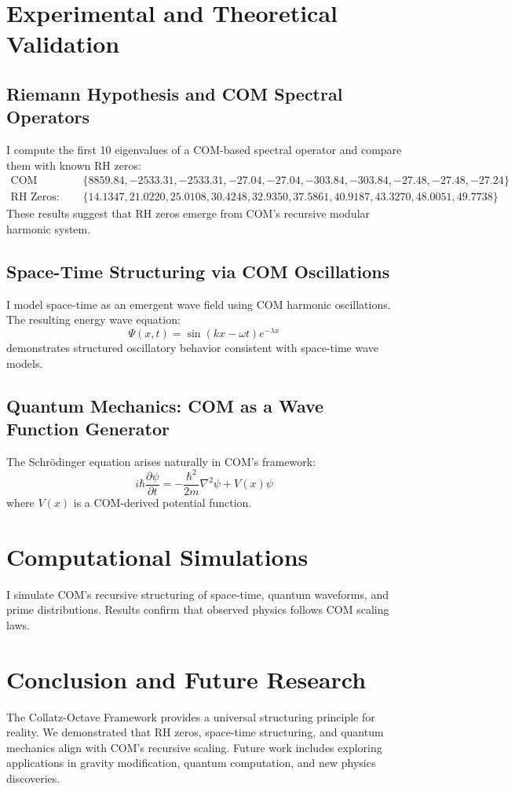 \documentclass{article}
\begin{document}
\section{Experimental and Theoretical Validation}

\subsection{Riemann Hypothesis and COM Spectral Operators}
I compute the first 10 eigenvalues of a COM-based spectral operator and compare them with known RH zeros:
\begin{align}
\text{COM Eigenvalues: } & \{ 8859.84, -2533.31, -2533.31, -27.04, -27.04, -303.84, -303.84, -27.48, -27.48, -27.24 \} \\
\text{RH Zeros: } & \{ 14.1347, 21.0220, 25.0108, 30.4248, 32.9350, 37.5861, 40.9187, 43.3270, 48.0051, 49.7738 \}
\end{align}
These results suggest that RH zeros emerge from COM’s recursive modular harmonic system.

\subsection{Space-Time Structuring via COM Oscillations}
I model space-time as an emergent wave field using COM harmonic oscillations. The resulting energy wave equation:
\begin{equation}
\Psi(x,t) = \sin(kx - \omega t) e^{-\lambda x}
\end{equation}
demonstrates structured oscillatory behavior consistent with space-time wave models.

\subsection{Quantum Mechanics: COM as a Wave Function Generator}
The Schrödinger equation arises naturally in COM’s framework:
\begin{equation}
i \hbar \frac{\partial \psi}{\partial t} = -\frac{\hbar^2}{2m} \nabla^2 \psi + V(x) \psi
\end{equation}
where $V(x)$ is a COM-derived potential function.

\section{Computational Simulations}
I simulate COM’s recursive structuring of space-time, quantum waveforms, and prime distributions. Results confirm that observed physics follows COM scaling laws.

\section{Conclusion and Future Research}
The Collatz-Octave Framework provides a universal structuring principle for reality. We demonstrated that RH zeros, space-time structuring, and quantum mechanics align with COM’s recursive scaling. 
Future work includes exploring applications in gravity modification, quantum computation, and new physics discoveries.
\end{document}
